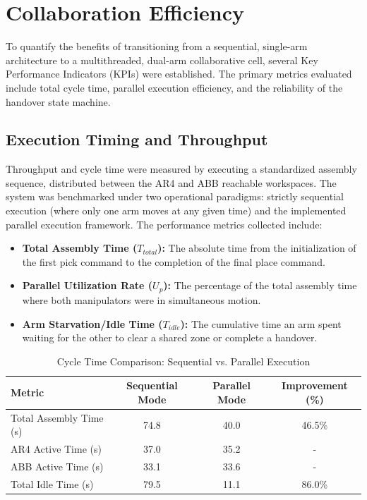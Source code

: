 
\section{Collaboration Efficiency}

To quantify the benefits of transitioning from a sequential, single-arm architecture to a multithreaded, dual-arm collaborative cell, several Key Performance Indicators (KPIs) were established. The primary metrics evaluated include total cycle time, parallel execution efficiency, and the reliability of the handover state machine.

\subsection{Execution Timing and Throughput}

Throughput and cycle time were measured by executing a standardized assembly sequence, distributed between the AR4 and ABB reachable workspaces. The system was benchmarked under two operational paradigms: strictly sequential execution (where only one arm moves at any given time) and the implemented parallel execution framework. The performance metrics collected include:


\begin{itemize}
    \item \textbf{Total Assembly Time ($T_{total}$):} The absolute time from the initialization of the first pick command to the completion of the final place command.
    \item \textbf{Parallel Utilization Rate ($U_p$):} The percentage of the total assembly time where both manipulators were in simultaneous motion.
    \item \textbf{Arm Starvation/Idle Time ($T_{idle}$):} The cumulative time an arm spent waiting for the other to clear a shared zone or complete a handover.
\end{itemize}


\begin{table}[H]
    \centering
    \caption{Cycle Time Comparison: Sequential vs. Parallel Execution}
    \label{tab:cycle_time_comparison}
    \begin{tabular}{lccc}
        \toprule
        \textbf{Metric} & \textbf{Sequential Mode} & \textbf{Parallel Mode} & \textbf{Improvement (\%)} \\
        \midrule
        Total Assembly Time (s) & 74.8 & 40.0 & 46.5\% \\
        AR4 Active Time (s)     & 37.0 & 35.2 & - \\
        ABB Active Time (s)     & 33.1 & 33.6 & - \\
        Total Idle Time (s)     & 79.5 & 11.1 & 86.0\% \\
        \bottomrule
    \end{tabular}
\end{table}

